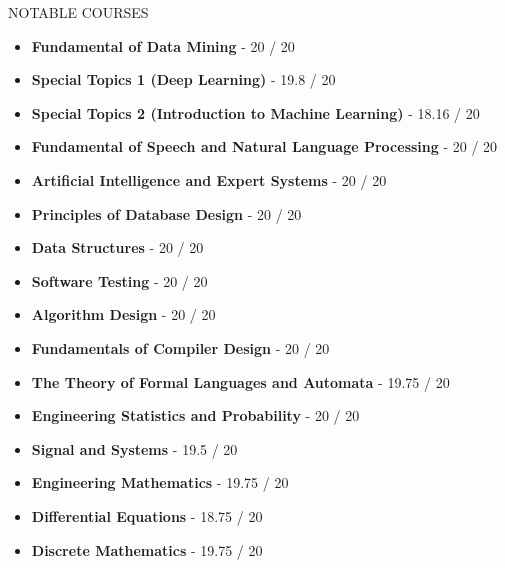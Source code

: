 \documentclass[]{CV}
\begin{document}
\begin{section}{NOTABLE COURSES}
\begin{multicols}{2}
    \begin{itemize}
	\item \textbf{Fundamental of Data Mining} - 20 / 20
	\item \textbf{Special Topics 1 (Deep Learning)} - 19.8 / 20
	\item \textbf{Special Topics 2 (Introduction to Machine Learning)} - 18.16 / 20
	\item \textbf{Fundamental of Speech and Natural Language Processing} - 20 / 20
	\item \textbf{Artificial Intelligence and Expert Systems} - 20 / 20
	
	\item \textbf{Principles of Database Design} - 20 / 20
	\item \textbf{Data Structures} - 20 / 20
	\item \textbf{Software Testing} - 20 / 20
	\item \textbf{Algorithm Design} - 20 / 20
	\item \textbf{Fundamentals of Compiler Design} - 20 / 20
	\item \textbf{The Theory of Formal Languages ​​and Automata} - 19.75 / 20
	
	\item \textbf{Engineering Statistics and Probability} - 20 / 20
	\item \textbf{Signal and Systems} - 19.5 / 20
	\item \textbf{Engineering Mathematics} - 19.75 / 20
	\item \textbf{Differential Equations} - 18.75 / 20
	\item \textbf{Discrete Mathematics} - 19.75 / 20
	
    \end{itemize}
    \end{multicols}
\end{section}
\end{document}
